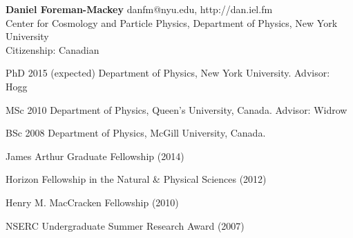 \documentclass[12pt,letterpaper]{article}
\begin{document}
\thispagestyle{empty}\sloppy\sloppypar\raggedbottom

\textbf{\Large Daniel Foreman-Mackey} \hfill
\textsf{\small danfm@nyu.edu, http://dan.iel.fm} \\[0.5ex]
Center for Cosmology and Particle Physics, Department of Physics, New York
University \\
Citizenship: Canadian\\[0.5ex]

\begin{list}{}{\cvlist}
\item
PhD 2015 (expected) Department of Physics, New York University. Advisor: Hogg
\item
MSc 2010 Department of Physics, Queen's University, Canada. Advisor: Widrow
\item
BSc 2008 Department of Physics, McGill University, Canada.
\end{list}

\begin{list}{}{\cvlist}

\item James Arthur Graduate Fellowship (2014)
\item Horizon Fellowship in the Natural \& Physical Sciences (2012)
\item Henry M. MacCracken Fellowship (2010)
\item NSERC Undergraduate Summer Research Award (2007)

\end{list}

\ifdefined\withpubs
    \begin{list}{}{\cvlist}
    
    \end{list}

    \begin{list}{}{\cvlist}
    
    \end{list}
\fi
\end{document}

